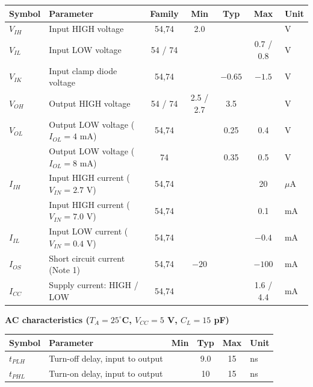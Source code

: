 \begingroup\fontsize{9}{10}\selectfont\setlength{\tabcolsep}{4pt}\renewcommand{\arraystretch}{.9}
\begin{tabularx}{\linewidth}{l X c c c c l}\toprule
Symbol&Parameter&Family&Min&Typ&Max&Unit\\\midrule
$V_{IH}$&Input HIGH voltage&54,74&2.0&&&V\\
$V_{IL}$&Input LOW voltage&54 / 74&&&0.7 / 0.8&V\\
$V_{IK}$&Input clamp diode voltage&54,74&&$-0.65$&$-1.5$&V\\
$V_{OH}$&Output HIGH voltage&54 / 74&2.5 / 2.7&3.5&&V\\
$V_{OL}$&Output LOW voltage ($I_{OL}=4$ mA)&54,74&&0.25&0.4&V\\
&Output LOW voltage ($I_{OL}=8$ mA)&74&&0.35&0.5&V\\
$I_{IH}$&Input HIGH current ($V_{IN}=2.7$ V)&54,74&&&20&$\mu$A\\
&Input HIGH current ($V_{IN}=7.0$ V)&54,74&&&0.1&mA\\
$I_{IL}$&Input LOW current ($V_{IN}=0.4$ V)&54,74&&&$-0.4$&mA\\
$I_{OS}$&Short circuit current (Note 1)&54,74&$-20$&&$-100$&mA\\
$I_{CC}$&Supply current: HIGH / LOW&54,74&&&1.6 / 4.4&mA\\\bottomrule
\end{tabularx}\par\smallskip
\textbf{AC characteristics ($T_A=25^\circ$C, $V_{CC}=5$ V, $C_L=15$ pF)}\par\smallskip
\begin{tabularx}{\linewidth}{l X c c c l}\toprule
Symbol&Parameter&Min&Typ&Max&Unit\\\midrule
$t_{PLH}$&Turn-off delay, input to output&&9.0&15&ns\\
$t_{PHL}$&Turn-on delay, input to output&&10&15&ns\\\bottomrule
\end{tabularx}\endgroup
